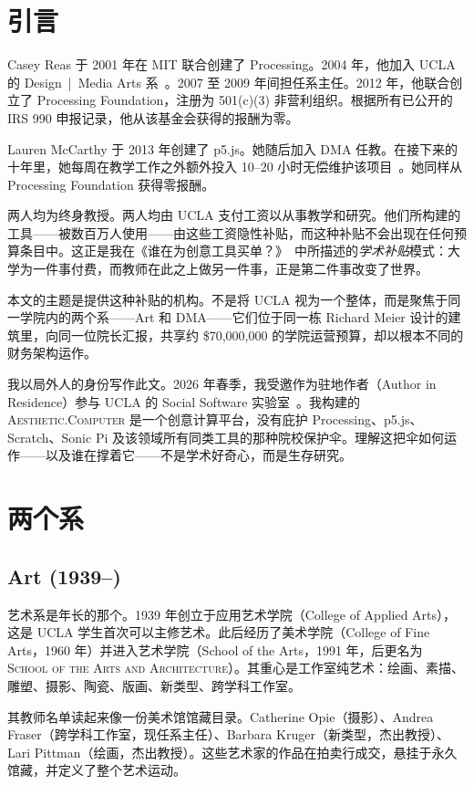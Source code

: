 \documentclass[10pt,letterpaper,twocolumn]{article}
\newcommand{\ac}{\textsc{Aesthetic.Computer}}
\newcommand{\dma}{\textsc{DMA}}
\newcommand{\sofa}{\textsc{School of the Arts and Architecture}}
\begin{document}
\section{引言}

Casey Reas 于 2001 年在 MIT 联合创建了 Processing。2004 年，他加入 UCLA 的 Design~|~Media Arts 系~\citep{dmahistory}。2007 至 2009 年间担任系主任。2012 年，他联合创立了 Processing Foundation，注册为 501(c)(3) 非营利组织。根据所有已公开的 IRS 990 申报记录，他从该基金会获得的报酬为零。

Lauren McCarthy 于 2013 年创建了 p5.js。她随后加入 \dma{} 任教。在接下来的十年里，她每周在教学工作之外额外投入 10--20 小时无偿维护该项目~\citep{mccarthy2023making}。她同样从 Processing Foundation 获得零报酬。

两人均为终身教授。两人均由 UCLA 支付工资以从事教学和研究。他们所构建的工具——被数百万人使用——由这些工资隐性补贴，而这种补贴不会出现在任何预算条目中。这正是我在《谁在为创意工具买单？》~\citep{scudder2026sustainability}中所描述的\emph{学术补贴}模式：大学为一件事付费，而教师在此之上做另一件事，正是第二件事改变了世界。

本文的主题是提供这种补贴的机构。不是将 UCLA 视为一个整体，而是聚焦于同一学院内的两个系——Art 和 \dma{}——它们位于同一栋 Richard Meier 设计的建筑里，向同一位院长汇报，共享约 \$70{,}000{,}000 的学院运营预算，却以根本不同的财务架构运作。

我以局外人的身份写作此文。2026 年春季，我受邀作为驻地作者（Author in Residence）参与 UCLA 的 Social Software 实验室~\citep{scudder2026ac}。我构建的 \ac{} 是一个创意计算平台，没有庇护 Processing、p5.js、Scratch、Sonic Pi 及该领域所有同类工具的那种院校保护伞。理解这把伞如何运作——以及谁在撑着它——不是学术好奇心，而是生存研究。

\section{两个系}

\subsection{Art (1939--)}

艺术系是年长的那个。1939 年创立于应用艺术学院（College of Applied Arts），这是 UCLA 学生首次可以主修艺术。此后经历了美术学院（College of Fine Arts，1960 年）并进入艺术学院（School of the Arts，1991 年，后更名为 \sofa{}）。其重心是工作室纯艺术：绘画、素描、雕塑、摄影、陶瓷、版画、新类型、跨学科工作室。

其教师名单读起来像一份美术馆馆藏目录。Catherine Opie（摄影）、Andrea Fraser（跨学科工作室，现任系主任）、Barbara Kruger（新类型，杰出教授）、Lari Pittman（绘画，杰出教授）。这些艺术家的作品在拍卖行成交，悬挂于永久馆藏，并定义了整个艺术运动。
\end{document}
